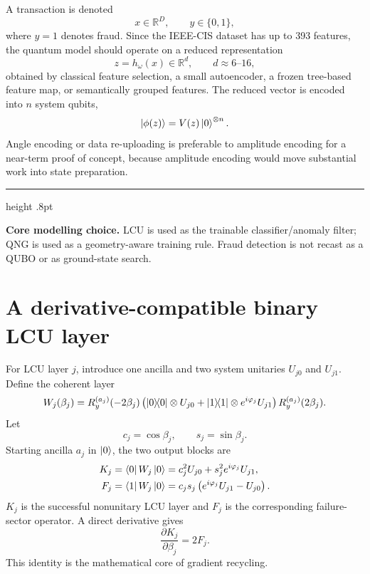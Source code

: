 \documentclass[11pt,a4paper]{article}
\newcommand{\R}{\mathbb{R}}
\newenvironment{keybox}
 {\par\smallskip\noindent\begin{minipage}{\linewidth}%
  {\color{blue!45!black}\hrule height .8pt}\vspace{5pt}}
 {\vspace{5pt}{\color{blue!45!black}\hrule height .8pt}%
  \end{minipage}\par\smallskip}
\begin{document}
A transaction is denoted
\begin{equation}
    x \in \R^D, \qquad y\in\{0,1\},
\end{equation}
where $y=1$ denotes fraud. Since the IEEE-CIS dataset has up to 393 features, the quantum model should operate on a reduced representation
\begin{equation}
    z=h_\omega(x)\in\R^d, \qquad d\approx 6\text{--}16,
\end{equation}
obtained by classical feature selection, a small autoencoder, a frozen tree-based feature map, or semantically grouped features. The reduced vector is encoded into $n$ system qubits,
\begin{equation}
    \ket{\phi(z)}=V(z)\ket{0}^{\otimes n}.
\end{equation}
Angle encoding or data re-uploading is preferable to amplitude encoding for a near-term proof of concept, because amplitude encoding would move substantial work into state preparation.

\begin{keybox}
\textbf{Core modelling choice.} LCU is used as the trainable classifier/anomaly filter; QNG is used as a geometry-aware training rule. Fraud detection is not recast as a QUBO or as ground-state search.
\end{keybox}

\section{A derivative-compatible binary LCU layer}

For LCU layer $j$, introduce one ancilla and two system unitaries $U_{j0}$ and $U_{j1}$. Define the coherent layer
\begin{equation}
W_j(\beta_j)
=
R_y^{(a_j)}(-2\beta_j)
\left(
\ketbra{0}{0}\otimes U_{j0}
+
\ketbra{1}{1}\otimes e^{i\varphi_j}U_{j1}
\right)
R_y^{(a_j)}(2\beta_j).
\end{equation}
Let
\begin{equation}
    c_j=\cos\beta_j,\qquad s_j=\sin\beta_j.
\end{equation}
Starting ancilla $a_j$ in $\ket{0}$, the two output blocks are
\begin{align}
K_j
&=\bra{0}W_j\ket{0}
=c_j^2U_{j0}+s_j^2e^{i\varphi_j}U_{j1},\\
F_j
&=\bra{1}W_j\ket{0}
=c_js_j\left(e^{i\varphi_j}U_{j1}-U_{j0}\right).
\end{align}
$K_j$ is the successful nonunitary LCU layer and $F_j$ is the corresponding failure-sector operator. A direct derivative gives
\begin{equation}
\boxed{
\frac{\partial K_j}{\partial\beta_j}=2F_j.
}
\label{eq:sector-derivative}
\end{equation}
This identity is the mathematical core of gradient recycling.
\end{document}
